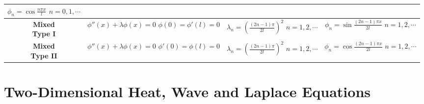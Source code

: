 \begin{enumerate}
\begin{center}
\begin{tabular}{|c|c|c|c|}
    \parbox[c][60pt]{90pt}{\centering $\displaystyle \phi_{n} = \cos\frac{n\pi x}{l}$ \\ \vspace{10pt} $n=0, 1, \cdots$} \\
    \hline
    \parbox[c][30pt]{90pt}{\centering \textbf{Mixed \\ \vspace{10pt} Type I}} & 
    \parbox[c][60pt]{90pt}{\centering $\phi''(x) + \lambda \phi(x)=0$ \\ \vspace{10pt} $\phi(0)=\phi'(l)=0$}
    & 
    \parbox[c][60pt]{100pt}{\centering $\displaystyle \lambda_{n}=\left( \frac{(2n-1)\pi}{2l} \right)^{2}$ \\ \vspace{10pt} $n=1, 2, \cdots$} & 
    \parbox[c][60pt]{100pt}{\centering $\displaystyle \phi_{n} = \sin\frac{(2n-1)\pi x}{2l}$ \\ \vspace{10pt} $n=1, 2, \cdots$} \\
    \hline
    \parbox[c][30pt]{90pt}{\centering \textbf{Mixed \\ \vspace{10pt} Type II}} & 
    \parbox[c][60pt]{90pt}{\centering $\phi''(x) + \lambda \phi(x)=0$ \\ \vspace{10pt} $\phi'(0)=\phi(l)=0$}
    & 
    \parbox[c][60pt]{100pt}{\centering $\displaystyle \lambda_{n}=\left( \frac{(2n-1)\pi}{2l} \right)^{2}$ \\ \vspace{10pt} $n=1, 2, \cdots$} & 
    \parbox[c][60pt]{100pt}{\centering $\displaystyle \phi_{n} = \cos\frac{(2n-1)\pi x}{2l}$ \\ \vspace{10pt} $n=1, 2, \cdots$} \\
    \hline
\end{tabular}
\end{center}


\end{enumerate}


\newpage

\section[2D Heat, Wave and Laplace Equations]{Two-Dimensional Heat, Wave and Laplace Equations}



